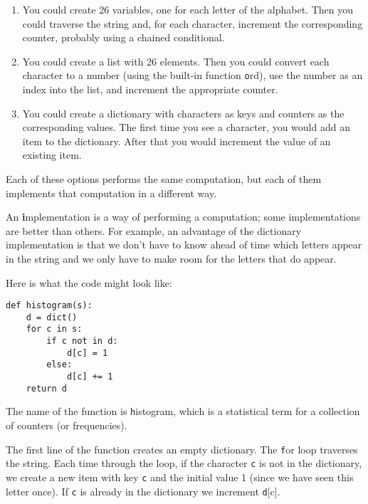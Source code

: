 \documentclass[
DIV=11,
fontsize=12,
twoside,
headinclude=false,
titlepage=firstiscover,
abstract=true,
headsepline=true,
footsepline=true,
chapterprefix=true, %
headings=big,
bibliography=totoc,%
captions=tableheading
]{scrbook}
\theoremstyle{definition}
\begin{document}
\begin{enumerate}

\item You could create 26 variables, one for each letter of the
alphabet.  Then you could traverse the string and, for each
character, increment the corresponding counter, probably using
a chained conditional.

\item You could create a list with 26 elements.  Then you could
convert each character to a number (using the built-in function
{\texttt ord}), use the number as an index into the list, and increment
the appropriate counter.

\item You could create a dictionary with characters as keys
and counters as the corresponding values.  The first time you
see a character, you would add an item to the dictionary.  After
that you would increment the value of an existing item.

\end{enumerate}

Each of these options performs the same computation, but each
of them implements that computation in a different way.

An {\textbf implementation} is a way of performing a computation;
some implementations are better than others.  For example,
an advantage of the dictionary implementation is that we don't
have to know ahead of time which letters appear in the string
and we only have to make room for the letters that do appear.

Here is what the code might look like:

\begin{lstlisting}
def histogram(s):
    d = dict()
    for c in s:
        if c not in d:
            d[c] = 1
        else:
            d[c] += 1
    return d
\end{lstlisting}
%
The name of the function is {\texttt histogram}, which is a statistical
term for a collection of counters (or frequencies).

The first line of the
function creates an empty dictionary.  The {\texttt for} loop traverses
the string.  Each time through the loop, if the character {\texttt c} is
not in the dictionary, we create a new item with key {\texttt c} and the
initial value 1 (since we have seen this letter once).  If {\texttt c} is
already in the dictionary we increment {\texttt d[c]}.
\end{document}
